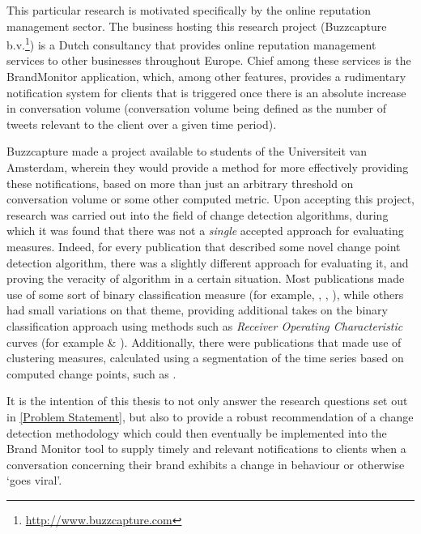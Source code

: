 \documentclass[../main.tex]{subfiles}
\begin{document}
This particular research is motivated specifically by the online reputation management sector. The business hosting this research project (Buzzcapture b.v.\footnote{\url{http://www.buzzcapture.com}}) is a Dutch consultancy that provides online reputation management services to other businesses throughout Europe. Chief among these services is the BrandMonitor application, which, among other features, provides a rudimentary notification system for clients that is triggered once there is an absolute increase in conversation volume (conversation volume being defined as the number of tweets relevant to the client over a given time period).

Buzzcapture made a project available to students of the Universiteit van Amsterdam, wherein they would provide a method for more effectively providing these notifications, based on more than just an arbitrary threshold on conversation volume or some other computed metric. Upon accepting this project, research was carried out into the field of change detection algorithms, during which it was found that there was not a \emph{single} accepted approach for evaluating measures. Indeed, for every publication that described some novel change point detection algorithm, there was a slightly different approach for evaluating it, and proving the veracity of algorithm in a certain situation. Most publications made use of some sort of binary classification measure (for example, \cite{Qahtan2015}, \cite{Buntain2014}, \cite{Pelecanos2010}), while others had small variations on that theme, providing additional takes on the binary classification approach using methods such as \emph{Receiver Operating Characteristic} curves (for example \cite{Fawcett1999} \& \cite{Desobry2005}). Additionally, there were publications that made use of clustering measures, calculated using a segmentation of the time series based on computed change points, such as \cite{Matteson2012}.

It is the intention of this thesis to not only answer the research questions set out in \autoref{Problem Statement}, but also to provide a robust recommendation of a change detection methodology which could then eventually be implemented into the Brand Monitor tool to supply timely and relevant notifications to clients when a conversation concerning their brand exhibits a change in behaviour or otherwise `goes viral'.
\end{document}

